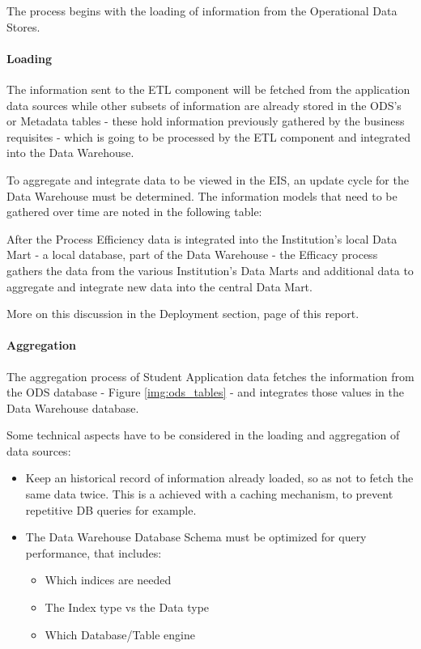 The process begins with the loading of information from the Operational Data
Stores.

\paragraph{Loading}

The information sent to the ETL component will be fetched from the application
data sources while other subsets of information are already stored in the ODS’s
or Metadata tables - these hold information previously gathered by the business
requisites - which is going to be processed by the ETL component and integrated
into the Data Warehouse.

To aggregate and integrate data to be viewed in the EIS, an update cycle for the
Data Warehouse must be determined. The information models that need to be
gathered over time are noted in the following table:  


After the Process Efficiency data is integrated into the Institution’s local
Data Mart - a local database, part of the Data Warehouse - the Efficacy process
gathers the data from the various Institution’s Data Marts and additional data
to aggregate and integrate new data into the central Data Mart.

More on this discussion in the Deployment section, page
\pageref{sec:deployment} of this report.

\paragraph{Aggregation}

The aggregation process of Student Application data fetches the information from
the ODS database - Figure \ref{img:ods_tables} - and integrates those
values in the Data Warehouse database.

Some technical aspects have to be considered in the loading and aggregation of
data sources:

\begin{itemize}
  \item Keep an historical record of information already loaded, so as not to
  fetch the same data twice. This is a achieved with a caching mechanism, to
  prevent repetitive DB queries for example.
  \item The Data Warehouse Database Schema must be optimized for query
  performance, that includes:
  \begin{itemize}
    \item Which indices are needed
    \item The Index type vs the Data type
    \item Which Database/Table engine
   \end{itemize}
\end{itemize}

